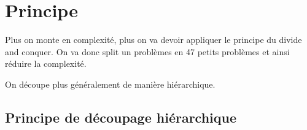 

    
    
    
    
    
    

\section{Principe}
Plus on monte en complexité, plus on va devoir appliquer le principe du divide and conquer. On va donc split un problèmes en 47 petits problèmes et ainsi réduire la complexité.

On découpe plus généralement de manière hiérarchique.

\subsection{Principe de découpage hiérarchique}

